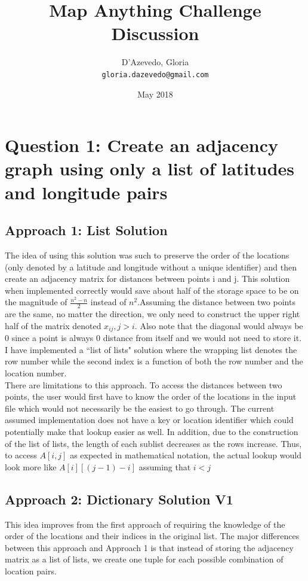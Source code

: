 \documentclass{article}
\title{Map Anything Challenge Discussion}
\author{
  D'Azevedo, Gloria\\
  \texttt{gloria.dazevedo@gmail.com}\\
}
\date{May 2018}
\begin{document}
\maketitle

\section{Question 1: Create an adjacency graph using only a list of latitudes and longitude pairs}
\subsection{Approach 1: List Solution}
The idea of using this solution was such to preserve the order of the locations (only denoted by a latitude and longitude without a unique identifier) and then create an adjacency matrix for distances between points i and j.  This solution when implemented correctly would save about half of the storage space to be on the magnitude of $\frac{n^2-n}{2}$ instead of $n^2$.Assuming the distance between two points are the same, no matter the direction, we only need to construct
the upper right half of the matrix denoted $x_{ij}, j>i$.  Also note that the diagonal would always be 0 since a point is always 0 distance from itself and we would not need to store it.  I have implemented a ``list of lists" solution where the wrapping list denotes the row number while the second index is a function of both the row number and the location number.  \\

There are limitations to this approach.  To access the distances between two points, the user would first have to know the order of the locations in the input file which would not necessarily be the easiest to go through.  The current assumed implementation does not have a key or location identifier which could potentially make that lookup easier as well.  In addition, due to the construction of the list of lists, the length of each sublist decreases as the rows increase.  Thus, to access $A[i,j]$ as expected in mathematical notation, the actual lookup would look more like $A[i][(j-1)-i]$ assuming that $i<j$

\subsection{Approach 2: Dictionary Solution V1}
This idea improves from the first approach of requiring the knowledge of the order of the locations and their indices in the original list.  The major differences between this approach and Approach 1 is that instead of storing the adjacency matrix as a list of lists, we create one tuple for each possible combination of location pairs. \\
\end{document}
